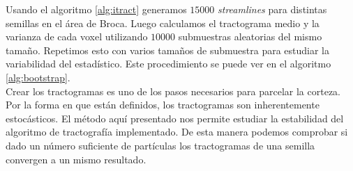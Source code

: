 Usando el algoritmo \ref{alg:itract} generamos $15000$ 
\textit{streamlines} para distintas semillas en el \'area de Broca. Luego
calculamos el tractograma medio y la varianza de cada voxel utilizando
$10000$ submuestras aleatorias del mismo tama\~no. Repetimos esto con
varios tama\~nos de submuestra para estudiar la variabilidad del 
estad\'istico. Este procedimiento se puede ver en el algoritmo 
\ref{alg:bootstrap}.\\

Crear los tractogramas es uno de los pasos necesarios para parcelar la
corteza. Por la forma en que est\'an definidos, los tractogramas son
inherentemente estoc\'asticos. El m\'etodo aqu\'i presentado nos permite
estudiar la estabilidad del algoritmo de tractograf\'ia implementado. De
esta manera podemos comprobar si dado un n\'umero suficiente de 
part\'iculas los tractogramas de una semilla convergen a un mismo 
resultado. \\
